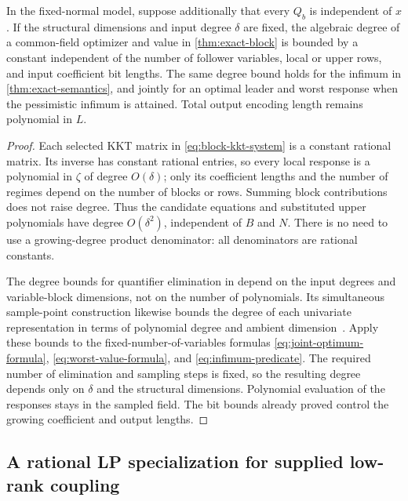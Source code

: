\begin{corollary}
\label{cor:constant-hessian-degree}
In the fixed-normal model, suppose additionally that every $Q_b$ is
independent of $x$. If the structural dimensions and input degree
$\delta$ are fixed, the algebraic degree of a common-field optimizer
and value in \cref{thm:exact-block} is bounded by a constant independent
of the number of follower variables, local or upper rows, and input
coefficient bit lengths. The same degree bound holds for the infimum
in \cref{thm:exact-semantics}, and jointly for an optimal leader and
worst response when the pessimistic infimum is attained. Total output
encoding length remains polynomial in $L$.
\end{corollary}
\begin{proof}
Each selected KKT matrix in \eqref{eq:block-kkt-system} is a constant
rational matrix. Its inverse has constant rational entries, so every
local response is a polynomial in $\zeta$ of degree $O(\delta)$;
only its coefficient lengths and the number of regimes depend on the
number of blocks or rows. Summing block contributions does not raise
degree. Thus the candidate equations and substituted upper polynomials
have degree $O(\delta^2)$, independent of $B$ and $N$. There is no
need to use a growing-degree product denominator: all denominators
are rational constants.

The degree bounds for quantifier elimination in
\cite[Theorem 1.3.1]{BasuPollackRoy1996} depend on the input degrees and
variable-block dimensions, not on the number of polynomials. Its
simultaneous sample-point construction likewise bounds the degree of
each univariate representation in terms of polynomial degree and
ambient dimension~\cite[Section 3.1.3]{BasuPollackRoy1996}.
Apply these bounds to the fixed-number-of-variables formulas
\eqref{eq:joint-optimum-formula}, \eqref{eq:worst-value-formula}, and
\eqref{eq:infimum-predicate}. The required number of elimination and
sampling steps is fixed, so the resulting degree depends only on
$\delta$ and the structural dimensions. Polynomial evaluation of the
responses stays in the sampled field. The bit bounds already proved
control the growing coefficient and output lengths.
\end{proof}

\subsection{A rational LP specialization for supplied low-rank coupling}\label{subsec:low-rank}

